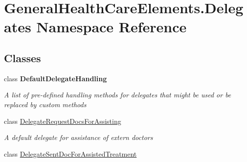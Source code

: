 \hypertarget{namespace_general_health_care_elements_1_1_delegates}{}\section{General\+Health\+Care\+Elements.\+Delegates Namespace Reference}
\label{namespace_general_health_care_elements_1_1_delegates}
\subsection*{Classes}
\begin{DoxyCompactItemize}
\item 
class {\bfseries Default\+Delegate\+Handling}
\begin{DoxyCompactList}\small\item\em A list of pre-\/defined handling methods for delegates that might be used or be replaced by custom methods \end{DoxyCompactList}\item 
class \hyperlink{class_general_health_care_elements_1_1_delegates_1_1_delegate_request_docs_for_assisting}{Delegate\+Request\+Docs\+For\+Assisting}
\begin{DoxyCompactList}\small\item\em A default delegate for assistance of extern doctors \end{DoxyCompactList}\item 
class \hyperlink{class_general_health_care_elements_1_1_delegates_1_1_delegate_sent_doc_for_assisted_treatment}{Delegate\+Sent\+Doc\+For\+Assisted\+Treatment}
\end{DoxyCompactItemize}
